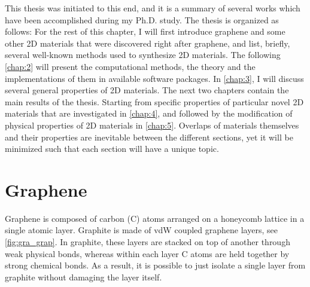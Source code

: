 This thesis was initiated to this end, and it is a summary of several works which have been accomplished during my Ph.D. study. The thesis is organized as follows: For the rest of this chapter, I will first introduce graphene and some other 2D materials that were discovered right after graphene, and list, briefly, several well-known methods used to synthesize 2D materials. The following \autoref{chap:2} will present the computational methods, the theory and the implementations of them in available software packages. In \autoref{chap:3}, I will discuss several general properties of 2D materials. The next two chapters contain the main results of the thesis. Starting from specific properties of particular novel 2D materials that are investigated in \autoref{chap:4}, and followed by the modification of physical properties of 2D materials in \autoref{chap:5}. Overlaps of materials themselves and their properties are inevitable between the different sections, yet it will be minimized such that each section will have a unique topic.

\section{Graphene}

Graphene is composed of carbon (C) atoms arranged on a honeycomb lattice in a single atomic layer. Graphite is made of vdW coupled graphene layers, see \autoref{fig:gra_grap}. In graphite, these layers are stacked on top of another through weak physical bonds, whereas within each layer C atoms are held together by strong chemical bonds. As a result, it is possible to just isolate a single layer from graphite without damaging the layer itself. 

